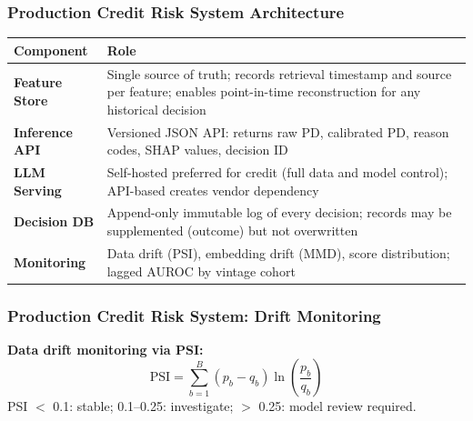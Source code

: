 \documentclass[9pt,t]{beamer}
\begin{document}
\begin{frame}
\frametitle{Production Credit Risk System Architecture}

\begin{center}
\begin{tabular}{lp{7.5cm}}
\toprule
Component & Role \\
\midrule
\textbf{Feature Store} & Single source of truth; records retrieval timestamp and source per feature; enables point-in-time reconstruction for any historical decision \\
\textbf{Inference API} & Versioned JSON API: returns raw PD, calibrated PD, reason codes, SHAP values, decision ID \\
\textbf{LLM Serving} & Self-hosted preferred for credit (full data and model control); API-based creates vendor dependency \\
\textbf{Decision DB} & Append-only immutable log of every decision; records may be supplemented (outcome) but not overwritten \\
\textbf{Monitoring} & Data drift (PSI), embedding drift (MMD), score distribution; lagged AUROC by vintage cohort \\
\bottomrule
\end{tabular}
\end{center}
\end{frame}

\begin{frame}
\frametitle{Production Credit Risk System: Drift Monitoring}

\textbf{Data drift monitoring via PSI:}
\[
  \text{PSI} = \sum_{b=1}^{B} (p_b - q_b) \ln\!\left(\frac{p_b}{q_b}\right)
\]
PSI $<$ 0.1: stable; 0.1--0.25: investigate; $>$ 0.25: model review required.
\end{frame}
\end{document}
